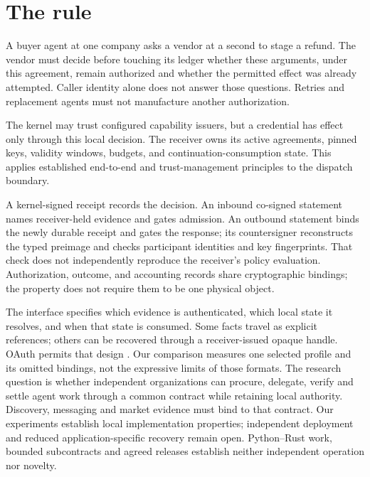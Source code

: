 \section{The rule}

A buyer agent at one company asks a vendor at a second to stage a refund.
The vendor must decide before touching its ledger whether these arguments,
under this agreement, remain authorized and whether the permitted effect was
already attempted. Caller identity alone does not answer those questions.
Retries and replacement agents must not manufacture another authorization.

The kernel may trust configured capability issuers, but a credential has effect
only through this local decision. The receiver owns its active agreements,
pinned keys, validity windows, budgets, and continuation-consumption state.
This applies established end-to-end and trust-management principles
\cite{saltzer1984,keynote,howell2000} to the dispatch boundary.

A kernel-signed receipt records the decision. An inbound co-signed statement
names receiver-held evidence and gates admission. An outbound statement binds
the newly durable receipt and gates the response; its countersigner reconstructs
the typed preimage and checks participant identities and key fingerprints.
That check does not independently reproduce the receiver's policy evaluation.
Authorization, outcome, and accounting records share cryptographic bindings;
the property does not require them to be one physical object.

The interface specifies which evidence is authenticated, which local state it
resolves, and when that state is consumed. Some facts travel as explicit
references; others can be recovered through a receiver-issued opaque handle.
OAuth permits that design \cite{rfc6749,rfc8693}. Our comparison measures one
selected profile and its omitted bindings, not the expressive limits of those
formats. The research question is whether independent organizations can
procure, delegate, verify and settle agent work through a common contract while
retaining local authority. Discovery, messaging and market evidence must bind
to that contract. Our experiments establish local implementation properties;
independent deployment and reduced application-specific recovery remain open.
Python--Rust work, bounded subcontracts and agreed releases establish neither
independent operation nor novelty.
